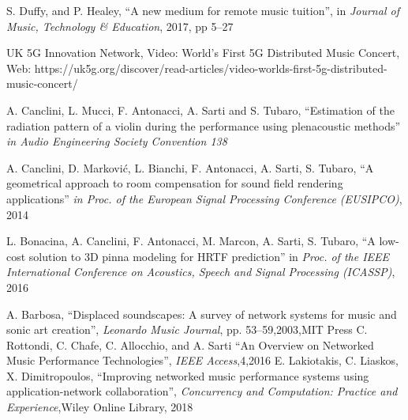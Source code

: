 \documentclass[conference]{IEEEtran}
\begin{document}
\begin{thebibliography}{6}
S. Duffy, and P. Healey, ``A new medium for remote music tuition'', in \emph{Journal of Music, Technology \& Education}, 2017, pp 5--27

UK 5G Innovation Network, Video: World's First 5G Distributed Music Concert, Web: https://uk5g.org/discover/read-articles/video-worlds-first-5g-distributed-music-concert/

A. Canclini, L. Mucci, F. Antonacci, A. Sarti and S. Tubaro, ``Estimation of the radiation pattern of a violin during the performance using plenacoustic methods'' \emph{in Audio Engineering Society Convention 138}

A. Canclini, D. Marković, L. Bianchi, F. Antonacci, A. Sarti, S. Tubaro, ``A geometrical approach to room compensation for sound field rendering applications'' \emph{in Proc. of the European Signal Processing Conference (EUSIPCO)}, 2014

L. Bonacina, A. Canclini, F. Antonacci, M. Marcon, A. Sarti, S. Tubaro, ``A low-cost solution to 3D pinna modeling for HRTF prediction'' in \emph{Proc. of the IEEE International Conference on Acoustics, Speech and Signal Processing (ICASSP)}, 2016


%	
%	
%	
%	
%	
%	
A. Barbosa, ``Displaced soundscapes: A survey of network systems for music and sonic art creation'',
\emph{Leonardo Music Journal},
pp. 53--59,2003,MIT Press
%
C. Rottondi, C. Chafe, C. Allocchio, and A. Sarti
``An Overview on Networked Music Performance Technologies'', \emph{IEEE Access},4,2016
%
E. Lakiotakis, C. Liaskos, X. Dimitropoulos, ``Improving networked music performance systems using application-network collaboration'', \emph{Concurrency and Computation: Practice and Experience},Wiley Online Library, 2018


\end{thebibliography}
\end{document}
